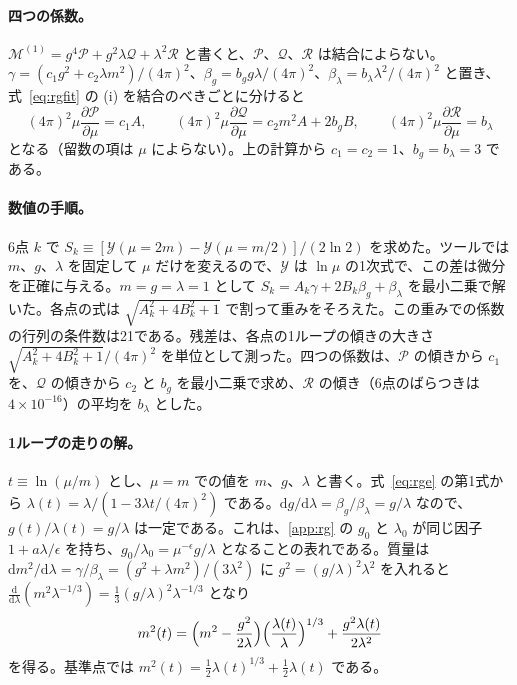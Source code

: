 \documentclass[a4paper,10pt]{ltjsarticle}
\newcommand{\dd}{\mathrm{d}}
\begin{document}
\paragraph{四つの係数。}$\mathcal{M}^{(1)}=g^4\mathcal{P}+g^2\lambda \mathcal{Q}+\lambda^2\mathcal{R}$ と書くと、$\mathcal{P}$、$\mathcal{Q}$、$\mathcal{R}$ は結合によらない。$\gamma=(c_1g^2+c_2\lambda m^2)/(4\pi)^2$、$\beta_g=b_gg\lambda/(4\pi)^2$、$\beta_\lambda=b_\lambda\lambda^2/(4\pi)^2$ と置き、式~\eqref{eq:rgfit} の (i) を結合のべきごとに分けると
\begin{equation*}
(4\pi)^2\mu\frac{\partial \mathcal{P}}{\partial\mu}=c_1A,\qquad
(4\pi)^2\mu\frac{\partial \mathcal{Q}}{\partial\mu}=c_2m^2A+2b_gB,\qquad
(4\pi)^2\mu\frac{\partial \mathcal{R}}{\partial\mu}=b_\lambda
\end{equation*}
となる（留数の項は $\mu$ によらない）。上の計算から $c_1=c_2=1$、$b_g=b_\lambda=3$ である。

\paragraph{数値の手順。}6点 $k$ で $S_k\equiv[\mathcal{Y}(\mu=2m)-\mathcal{Y}(\mu=m/2)]/(2\ln2)$ を求めた。ツールでは $m$、$g$、$\lambda$ を固定して $\mu$ だけを変えるので、$\mathcal{Y}$ は $\ln\mu$ の1次式で、この差は微分を正確に与える。$m=g=\lambda=1$ として $S_k=A_k\gamma+2B_k\beta_g+\beta_\lambda$ を最小二乗で解いた。各点の式は $\sqrt{A_k^2+4B_k^2+1}$ で割って重みをそろえた。この重みでの係数の行列の条件数は21である。残差は、各点の1ループの傾きの大きさ $\sqrt{A_k^2+4B_k^2+1}/(4\pi)^2$ を単位として測った。四つの係数は、$\mathcal{P}$ の傾きから $c_1$ を、$\mathcal{Q}$ の傾きから $c_2$ と $b_g$ を最小二乗で求め、$\mathcal{R}$ の傾き（6点のばらつきは $4\times10^{-16}$）の平均を $b_\lambda$ とした。

\paragraph{1ループの走りの解。}$t\equiv\ln(\mu/m)$ とし、$\mu=m$ での値を $m$、$g$、$\lambda$ と書く。式~\eqref{eq:rge} の第1式から $\lambda(t)=\lambda/(1-3\lambda t/(4\pi)^2)$ である。$\dd g/\dd\lambda=\beta_g/\beta_\lambda=g/\lambda$ なので、$g(t)/\lambda(t)=g/\lambda$ は一定である。これは、\ref{app:rg} の $g_0$ と $\lambda_0$ が同じ因子 $1+a\lambda/\epsilon$ を持ち、$g_0/\lambda_0=\mu^{-\epsilon}g/\lambda$ となることの表れである。質量は $\dd m^2/\dd\lambda=\gamma/\beta_\lambda=(g^2+\lambda m^2)/(3\lambda^2)$ に $g^2=(g/\lambda)^2\lambda^2$ を入れると $\frac{\dd}{\dd\lambda}(m^2\lambda^{-1/3})=\frac13(g/\lambda)^2\lambda^{-1/3}$ となり
\begin{equation*}
m^2(t)=\Bigl(m^2-\frac{g^2}{2\lambda}\Bigr)\Bigl(\frac{\lambda(t)}{\lambda}\Bigr)^{1/3}+\frac{g^2\lambda(t)}{2\lambda^2}
\end{equation*}
を得る。基準点では $m^2(t)=\frac12\lambda(t)^{1/3}+\frac12\lambda(t)$ である。
\end{document}
